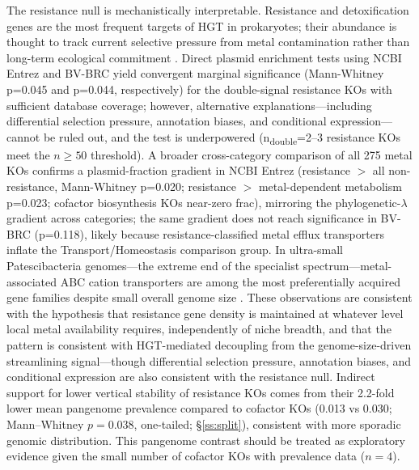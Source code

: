 \documentclass[times]{zHenriquesLab-StyleBioRxiv}
\begin{document}
The resistance null is mechanistically interpretable. Resistance and
detoxification genes are the most frequent targets of HGT in prokaryotes; their
abundance is thought to track current selective pressure from metal
contamination rather than long-term ecological commitment \cite{pal2015,gios2025}.
Direct plasmid enrichment tests using NCBI Entrez and BV-BRC yield convergent marginal
significance (Mann-Whitney p=0.045 and p=0.044, respectively) for the double-signal
resistance KOs with sufficient database coverage; however, alternative explanations---including
differential selection pressure, annotation biases, and conditional expression---cannot be
ruled out, and the test is underpowered (n\textsubscript{double}=2--3 resistance KOs meet the
$n{\geq}50$ threshold). A broader cross-category comparison of all 275 metal KOs confirms a plasmid-fraction
gradient in NCBI Entrez (resistance $>$ all non-resistance, Mann-Whitney p=0.020; resistance $>$
metal-dependent metabolism p=0.023; cofactor biosynthesis KOs near-zero frac), mirroring the
phylogenetic-$\lambda$ gradient across categories; the same gradient does not reach significance
in BV-BRC (p=0.118), likely because resistance-classified metal efflux transporters
inflate the Transport/Homeostasis comparison group. In
ultra-small Patescibacteria genomes---the extreme end of the specialist
spectrum---metal-associated ABC cation transporters are among the most
preferentially acquired gene families despite small overall genome size
\cite{gios2025}. These observations are consistent with the hypothesis that
resistance gene density is maintained at whatever level local metal availability
requires, independently of niche breadth, and that the pattern is consistent
with HGT-mediated decoupling from the genome-size-driven streamlining
signal---though differential selection pressure, annotation biases, and
conditional expression are also consistent with the resistance null.
Indirect support for lower vertical stability of resistance KOs comes from their
2.2-fold lower mean pangenome prevalence compared to cofactor KOs (0.013 vs 0.030;
Mann--Whitney $p = 0.038$, one-tailed; \S\ref{ss:split}), consistent with more
sporadic genomic distribution. This pangenome contrast should be treated as
exploratory evidence given the small number of cofactor KOs with prevalence data
($n = 4$).
\end{document}

